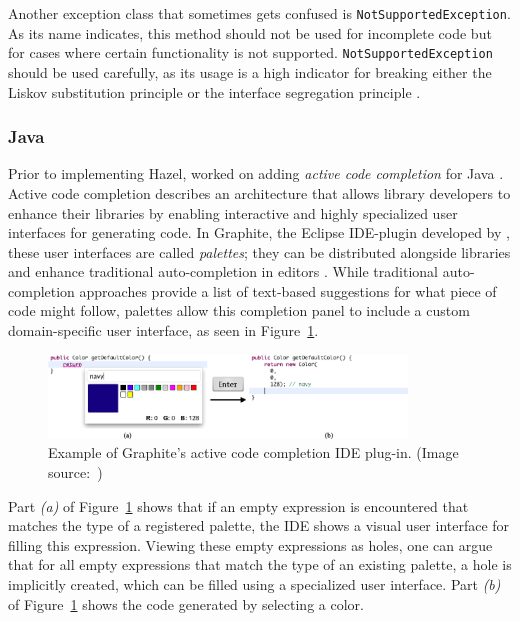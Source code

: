 Another exception class that sometimes gets confused is \texttt{NotSupportedException}.
As its name indicates, this method should not be used for incomplete code but for cases where certain functionality is not supported.
\texttt{NotSupportedException} should be used carefully, as its usage is a high indicator for breaking either the Liskov substitution principle or the interface segregation principle \cite{patrik_liskov_2017}.


\subsubsection{Java}
Prior to implementing Hazel, \citeauthor{omar_active_2012} worked on adding \emph{active code completion} for Java \cite{omar_active_2012}.
Active code completion describes an architecture that allows library developers to enhance their libraries by enabling interactive and highly specialized user interfaces for generating code.
In Graphite, the Eclipse IDE-plugin developed by \citeauthor{omar_active_2012}, these user interfaces are called \emph{palettes}; they can be distributed alongside libraries and enhance traditional auto-completion in editors \cite{omar_active_2012}.
While traditional auto-completion approaches provide a list of text-based suggestions for what piece of code might follow, palettes allow this completion panel to include a custom domain-specific user interface, as seen in Figure~\ref{fig:graphite-active-code-completion}.

\begin{figure}[ht]
    \centering
    \includegraphics[width=0.85\textwidth]{images/active-code-completion}
    \caption{Example of Graphite's active code completion IDE plug-in. (Image source:~\cite{omar_active_2012})}
    \label{fig:graphite-active-code-completion}
\end{figure}

Part \emph{(a)} of Figure~\ref{fig:graphite-active-code-completion} shows that if an empty expression is encountered that matches the type of a registered palette, the IDE shows a visual user interface for filling this expression.
Viewing these empty expressions as holes, one can argue that for all empty expressions that match the type of an existing palette, a hole is implicitly created, which can be filled using a specialized user interface.
Part \emph{(b)} of Figure~\ref{fig:graphite-active-code-completion} shows the code generated by selecting a color.

